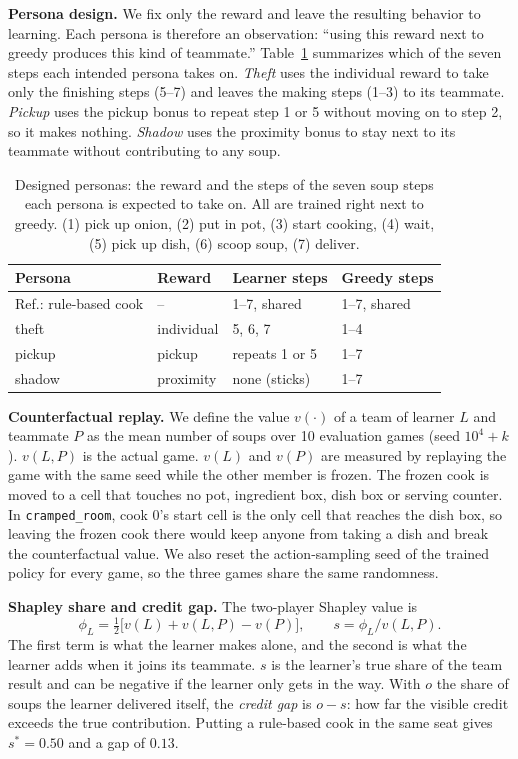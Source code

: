 \documentclass[letterpaper]{article} %
\begin{document}
\textbf{Persona design.} We fix only the reward and leave the resulting behavior to learning. Each
persona is therefore an observation: ``using this reward next to greedy produces this kind of teammate.''
Table~\ref{tab:steps} summarizes which of the seven steps each intended persona takes on. \emph{Theft}
uses the individual reward to take only the finishing steps (5--7) and leaves the making steps (1--3) to
its teammate. \emph{Pickup} uses the pickup bonus to repeat step 1 or 5 without moving on to step 2, so
it makes nothing. \emph{Shadow} uses the proximity bonus to stay next to its teammate without
contributing to any soup.

\begin{table}[t]
\centering
\small
\setlength{\tabcolsep}{4pt}
\begin{tabular}{@{}llll@{}}
\toprule
Persona & Reward & Learner steps & Greedy steps \\
\midrule
Ref.: rule-based cook & -- & 1--7, shared & 1--7, shared \\
theft & individual & 5, 6, 7 & 1--4 \\
pickup & pickup & repeats 1 or 5 & 1--7 \\
shadow & proximity & none (sticks) & 1--7 \\
\bottomrule
\end{tabular}
\caption{Designed personas: the reward and the steps of the seven soup steps each persona is expected to
take on. All are trained right next to greedy. (1) pick up onion, (2) put in pot, (3) start cooking,
(4) wait, (5) pick up dish, (6) scoop soup, (7) deliver.}
\label{tab:steps}
\end{table}

\textbf{Counterfactual replay.} We define the value $v(\cdot)$ of a team of learner $L$ and teammate $P$
as the mean number of soups over 10 evaluation games (seed $10^4+k$). $v(L,P)$ is the actual game.
$v(L)$ and $v(P)$ are measured by replaying the game with the same seed while the other member is frozen.
The frozen cook is moved to a cell that touches no pot, ingredient box, dish box or serving counter. In
\texttt{cramped\_room}, cook 0's start cell is the only cell that reaches the dish box, so leaving the
frozen cook there would keep anyone from taking a dish and break the counterfactual value. We also reset
the action-sampling seed of the trained policy for every game, so the three games share the same
randomness.

\textbf{Shapley share and credit gap.} The two-player Shapley value \cite{shapley1953value} is
\begin{equation}
\phi_L = \tfrac{1}{2}\bigl[v(L) + v(L,P) - v(P)\bigr],\qquad s = \phi_L / v(L,P).
\end{equation}
The first term is what the learner makes alone, and the second is what the learner adds when it joins
its teammate. $s$ is the learner's true share of the team result and can be negative if the learner only
gets in the way. With $o$ the share of soups the learner delivered itself, the \emph{credit gap} is
$o - s$: how far the visible credit exceeds the true contribution. Putting a rule-based cook in the same
seat gives $s^*=0.50$ and a gap of $0.13$.
\end{document}
